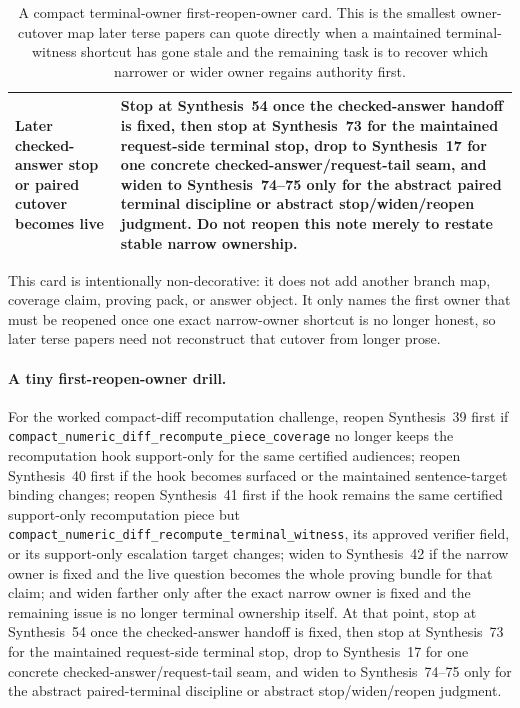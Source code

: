 \documentclass[11pt]{article}
\begin{document}
\begin{table}[t]
\begin{tabularx}{\linewidth}{@{}lX@{}}
Later checked-answer stop or paired cutover becomes live & Stop at Synthesis~54 once the checked-answer handoff is fixed, then stop at Synthesis~73 for the maintained request-side terminal stop, drop to Synthesis~17 for one concrete checked-answer/request-tail seam, and widen to Synthesis~74--75 only for the abstract paired terminal discipline or abstract stop/widen/reopen judgment. Do not reopen this note merely to restate stable narrow ownership. \\
\bottomrule
\end{tabularx}
\caption{A compact terminal-owner first-reopen-owner card. This is the smallest owner-cutover map later terse papers can quote directly when a maintained terminal-witness shortcut has gone stale and the remaining task is to recover which narrower or wider owner regains authority first.}
\label{tab:terminal-witness-first-reopen-owner-card}
\end{table}

This card is intentionally non-decorative: it does not add another branch map, coverage claim, proving pack, or answer object. It only names the first owner that must be reopened once one exact narrow-owner shortcut is no longer honest, so later terse papers need not reconstruct that cutover from longer prose.\cite{series:challengecoverage,series:challengesurfacehooks,series:challengeanswerreviewmenus,series:publicrequestresponsepacketrefreshresponsepacketclosureverdicts,series:pairedterminalcitationdiscipline,series:pairedterminalcutoverrules}

\paragraph{A tiny first-reopen-owner drill.}
For the worked compact-diff recomputation challenge, reopen Synthesis~39 first if \nolinkurl{compact_numeric_diff_recompute_piece_coverage} no longer keeps the recomputation hook support-only for the same certified audiences; reopen Synthesis~40 first if the hook becomes surfaced or the maintained sentence-target binding changes; reopen Synthesis~41 first if the hook remains the same certified support-only recomputation piece but \nolinkurl{compact_numeric_diff_recompute_terminal_witness}, its approved verifier field, or its support-only escalation target changes; widen to Synthesis~42 if the narrow owner is fixed and the live question becomes the whole proving bundle for that claim; and widen farther only after the exact narrow owner is fixed and the remaining issue is no longer terminal ownership itself. At that point, stop at Synthesis~54 once the checked-answer handoff is fixed, then stop at Synthesis~73 for the maintained request-side terminal stop, drop to Synthesis~17 for one concrete checked-answer/request-tail seam, and widen to Synthesis~74--75 only for the abstract paired-terminal discipline or abstract stop/widen/reopen judgment.\cite{series:workedexample}
\end{document}

